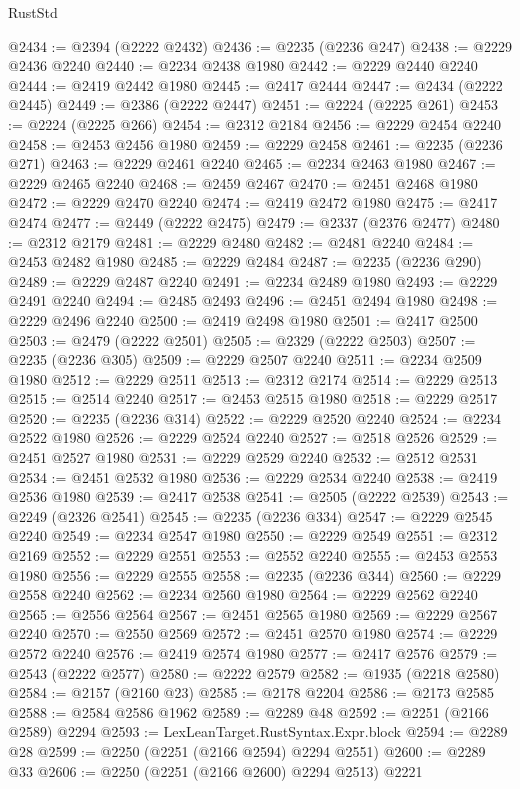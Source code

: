 \begin{lexlean}{RustStd}
\begin{coremodule}
{\begin{coremodule}
{{{{{{{{{{{{{{{{{{{{{{{{{{{{{{{{{{{{{{{{{{{{{{{{{{{{{@2434 := @2394 (@2222 @2432)
@2436 := @2235 (@2236 @247)
@2438 := @2229 @2436 @2240
@2440 := @2234 @2438 @1980
@2442 := @2229 @2440 @2240
@2444 := @2419 @2442 @1980
@2445 := @2417 @2444
@2447 := @2434 (@2222 @2445)
@2449 := @2386 (@2222 @2447)
@2451 := @2224 (@2225 @261)
@2453 := @2224 (@2225 @266)
@2454 := @2312 @2184
@2456 := @2229 @2454 @2240
@2458 := @2453 @2456 @1980
@2459 := @2229 @2458
@2461 := @2235 (@2236 @271)
@2463 := @2229 @2461 @2240
@2465 := @2234 @2463 @1980
@2467 := @2229 @2465 @2240
@2468 := @2459 @2467
@2470 := @2451 @2468 @1980
@2472 := @2229 @2470 @2240
@2474 := @2419 @2472 @1980
@2475 := @2417 @2474
@2477 := @2449 (@2222 @2475)
@2479 := @2337 (@2376 @2477)
@2480 := @2312 @2179
@2481 := @2229 @2480
@2482 := @2481 @2240
@2484 := @2453 @2482 @1980
@2485 := @2229 @2484
@2487 := @2235 (@2236 @290)
@2489 := @2229 @2487 @2240
@2491 := @2234 @2489 @1980
@2493 := @2229 @2491 @2240
@2494 := @2485 @2493
@2496 := @2451 @2494 @1980
@2498 := @2229 @2496 @2240
@2500 := @2419 @2498 @1980
@2501 := @2417 @2500
@2503 := @2479 (@2222 @2501)
@2505 := @2329 (@2222 @2503)
@2507 := @2235 (@2236 @305)
@2509 := @2229 @2507 @2240
@2511 := @2234 @2509 @1980
@2512 := @2229 @2511
@2513 := @2312 @2174
@2514 := @2229 @2513
@2515 := @2514 @2240
@2517 := @2453 @2515 @1980
@2518 := @2229 @2517
@2520 := @2235 (@2236 @314)
@2522 := @2229 @2520 @2240
@2524 := @2234 @2522 @1980
@2526 := @2229 @2524 @2240
@2527 := @2518 @2526
@2529 := @2451 @2527 @1980
@2531 := @2229 @2529 @2240
@2532 := @2512 @2531
@2534 := @2451 @2532 @1980
@2536 := @2229 @2534 @2240
@2538 := @2419 @2536 @1980
@2539 := @2417 @2538
@2541 := @2505 (@2222 @2539)
@2543 := @2249 (@2326 @2541)
@2545 := @2235 (@2236 @334)
@2547 := @2229 @2545 @2240
@2549 := @2234 @2547 @1980
@2550 := @2229 @2549
@2551 := @2312 @2169
@2552 := @2229 @2551
@2553 := @2552 @2240
@2555 := @2453 @2553 @1980
@2556 := @2229 @2555
@2558 := @2235 (@2236 @344)
@2560 := @2229 @2558 @2240
@2562 := @2234 @2560 @1980
@2564 := @2229 @2562 @2240
@2565 := @2556 @2564
@2567 := @2451 @2565 @1980
@2569 := @2229 @2567 @2240
@2570 := @2550 @2569
@2572 := @2451 @2570 @1980
@2574 := @2229 @2572 @2240
@2576 := @2419 @2574 @1980
@2577 := @2417 @2576
@2579 := @2543 (@2222 @2577)
@2580 := @2222 @2579
@2582 := @1935 (@2218 @2580)
@2584 := @2157 (@2160 @23)
@2585 := @2178 @2204
@2586 := @2173 @2585
@2588 := @2584 @2586 @1962
@2589 := @2289 @48
@2592 := @2251 (@2166 @2589) @2294
@2593 := LexLeanTarget.RustSyntax.Expr.block
@2594 := @2289 @28
@2599 := @2250 (@2251 (@2166 @2594) @2294 @2551)
@2600 := @2289 @33
@2606 := @2250 (@2251 (@2166 @2600) @2294 @2513) @2221
}}}}}}}}}}}}}}}}}}}}}}}}}}}}}}}}}}}}}}}}}}}}}}}}}}}}}
\end{coremodule}}
\end{coremodule}
\end{lexlean}
